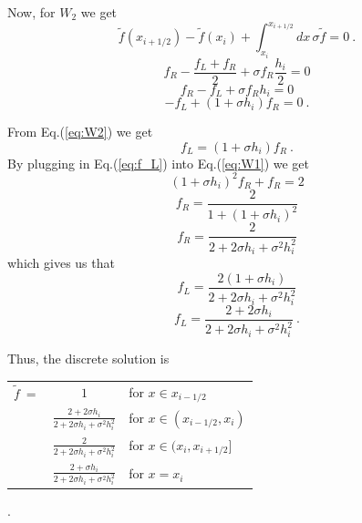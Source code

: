 \documentclass{article}
\begin{document}
Now, for $W_2$ we get
\begin{equation*}
\tilde{f} (x_{i+1/2}) - \tilde{f} (x_{i}) + \int_{x_{i}}^{x_{i+1/2}} dx \, \sigma \tilde{f} = 0   \: .
\end{equation*}
\begin{equation*}
f_R - \frac{f_L + f_R}{2} + \sigma f_R \frac{h_i}{2}  = 0 
\end{equation*}
\begin{equation*}
f_R - f_L + \sigma f_R h_i  = 0 
\end{equation*}
\begin{equation}
\label{eq:W2}
-f_L + (1 + \sigma h_i) f_R = 0 \: .
\end{equation}

From Eq.(\ref{eq:W2}) we get
\begin{equation}
\label{eq:f_L}
f_L  = (1 + \sigma h_i) f_R \: .
\end{equation}
By plugging in Eq.(\ref{eq:f_L}) into Eq.(\ref{eq:W1}) we get
\begin{equation*}
(1 + \sigma h_i)^2 f_R + f_R = 2  
\end{equation*}
\begin{equation*}
f_R = \frac{2}{1 + (1 + \sigma h_i)^2}  
\end{equation*}
\begin{equation*}
f_R = \frac{2}{2 + 2 \sigma h_i + \sigma^2 h_i^2}  
\end{equation*}
which gives us that 
\begin{equation*}
f_L  = \frac{2(1 + \sigma h_i)}{2 + 2 \sigma h_i + \sigma^2 h_i^2} 
\end{equation*}
\begin{equation*}
f_L  = \frac{2 + 2 \sigma h_i}{2 + 2 \sigma h_i + \sigma^2 h_i^2}  \: .
\end{equation*}

\pagebreak

Thus, the discrete solution is

\begin{center}
\begin{tabular}{ |l c l| }
  \hline
  $\tilde{f} \: =$ & $1$ & for $x \in x_{i-1/2}$ \\
   & $\frac{2 + 2 \sigma h_i}{2 + 2 \sigma h_i + \sigma^2 h_i^2}$ & for $x \in (x_{i-1/2},x_{i})$\\
   & $\frac{2}{2 + 2 \sigma h_i + \sigma^2 h_i^2} $ & for $x \in (x_{i},x_{i+1/2}]$ \\
   & $\frac{2 + \sigma h_i}{2 + 2 \sigma h_i + \sigma^2 h_i^2}$ & for $x = x_{i}$ \\
  \hline
\end{tabular} \: .
\end{center} 
\end{document}
